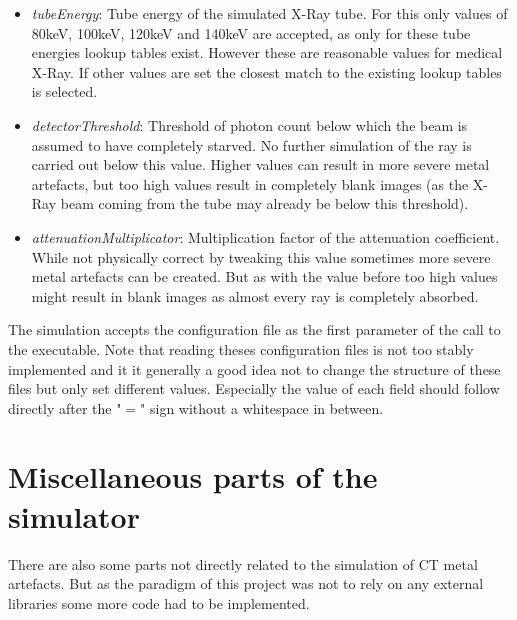 \begin{itemize}
	\item\emph{tubeEnergy}: Tube energy of the simulated X-Ray tube. For this only values of 80keV, 100keV, 120keV and 140keV are accepted, as only for these tube energies lookup tables exist. However these are reasonable values for medical X-Ray. If other values are set the closest match to the existing lookup tables is selected.
	\item\emph{detectorThreshold}: Threshold of photon count below which the beam is assumed to have completely starved. No further simulation of the ray is carried out below this value. Higher values can result in more severe metal artefacts, but too high values result in completely blank images (as the X-Ray beam coming from the tube may already be below this threshold).
	\item\emph{attenuationMultiplicator}: Multiplication factor of the attenuation coefficient. While not physically correct by tweaking this value sometimes more severe metal artefacts can be created. But as with the value before too high values might result in blank images as almost every ray is completely absorbed.
\end{itemize}
\par The simulation accepts the configuration file as the first parameter of the call to the executable. Note that reading theses configuration files is not too stably implemented and it it generally a good idea not to change the structure of these files but only set different values. Especially the value of each field should follow directly after the "\(=\)" sign without a whitespace in between.
\section{Miscellaneous parts of the simulator}
\par There are also some parts not directly related to the simulation of CT metal artefacts. But as the paradigm of this project was not to rely on any external libraries some more code had to be implemented. 
